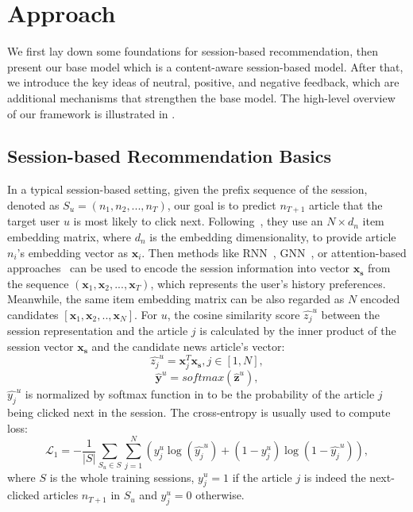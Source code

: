 \section{Approach}
\label{sec:approach}
We first lay down some foundations for session-based recommendation, 
then present our base model which is a content-aware session-based model.
After that, we introduce the key ideas of neutral, positive, 
and negative feedback,
which are additional mechanisms that strengthen the base model. 
The high-level overview of our framework is illustrated in . 

\subsection{Session-based Recommendation Basics}
In a typical session-based setting, given the prefix sequence of the session, denoted as $S_u=(n_1, n_2,...,n_T)$, our goal is 
to predict $n_{T+1}$ article that the target user $u$ is most likely to click next. 
Following~\cite{liu2018stamp}, they use an $N\times d_n$ 
item embedding matrix, where $d_n$ is the embedding dimensionality, to provide article $n_i$'s embedding vector
as $\mathbf{x}_i$. Then methods like RNN~\cite{hidasi2018recurrent}, GNN~\cite{wu2019session,pan2020star}, 
or attention-based approaches~\cite{kang_self-attentive_2018,liu2018stamp} can be used to 
encode the session information into vector $\mathbf{x_s}$ from the sequence 
${(\mathbf{x}_1, \mathbf{x}_2, ..., \mathbf{x}_T)}$, which represents the user's history preferences.
Meanwhile, the same item embedding matrix can be also regarded as $N$ encoded candidates $[\mathbf{x}_1, \mathbf{x}_2,.., \mathbf{x}_N]$.
For $u$, the cosine similarity score $\hat{z_j}^u$ between the session representation and the article $j$ is calculated by the inner product of the session vector $\mathbf{x_s}$ and the candidate news article's vector:
\begin{equation}
    \label{eq:zj}
    \hat{z_j}^u = \mathbf{x}_j^T\mathbf{x_s}, j\in[1,N],
\end{equation}
\begin{equation}
    \label{eq:yy}
    \hat{\mathbf{y}}^u = softmax(\hat{\mathbf{z}}^u),
\end{equation}
$\hat{y_j}^u$ is normalized by softmax function in  to be the probability of the article $j$ being clicked next in the session. 
The cross-entropy is usually used to compute loss:
\begin{equation}
    \label{eq:l1}
    \mathcal{L}_1 = - \frac{1}{|S|}\sum_{S_u \in S}\sum_{j=1}^N ( y_j^u \log(\hat{y_j}^u) + (1-y_j^u)\log(1-\hat{y_j}^u)),
\end{equation}
where $S$ is the whole training sessions, $y_j^u=1$ if the article $j$ is indeed the next-clicked articles $n_{T+1}$ in $S_u$ and $y_j^u=0$ otherwise.

